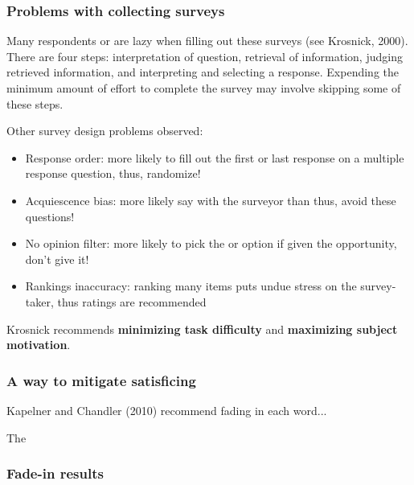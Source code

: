 \documentclass[slides]{beamer} %
\begin{document}
\begin{frame}\frametitle{Problems with collecting surveys}
\pause

\small

Many respondents  or are lazy when filling out these surveys (see Krosnick, 2000). \pause There are four steps: interpretation of question, \pause retrieval of information, \pause judging retrieved information, \pause and interpreting and selecting a response. \pause
Expending the minimum amount of effort to complete the survey may involve skipping some of these steps. \pause

Other survey design problems observed: \pause

\begin{itemize}
\item Response order: more likely to fill out the first or last response on a multiple response question, thus, randomize! \pause
\item Acquiescence bias: more likely say   with the surveyor than  thus, avoid these questions! \pause
\item No opinion filter: more likely to pick the  or  option if given the opportunity, don't give it! \pause
\item Rankings inaccuracy: ranking many items puts undue stress on the survey-taker, thus ratings are recommended \pause
\end{itemize}

Krosnick recommends \textbf{minimizing task difficulty} and \textbf{maximizing subject motivation}.

\end{frame}

\begin{frame}\frametitle{A way to mitigate satisficing}

Kapelner and Chandler (2010) recommend fading in each word... \pause

\begin{figure}[htp]
\centering
{}
\end{figure}
\centering \small
The 

\end{frame}

\begin{frame}\frametitle{Fade-in results}

\end{frame}
\end{document}

